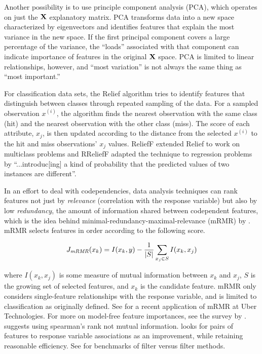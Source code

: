 \documentclass[11pt]{article}
\renewcommand{\xi}{x^{(i)}}
\begin{document}
Another possibility is to use principle component analysis (PCA), which operates on just the $\bf X$ explanatory matrix. PCA transforms data into a new space characterized by eigenvectors and identifies features that explain the most variance in the new space. If the first principal component covers a large percentage of the variance, the ``loads'' associated with that component can indicate importance of features in the original $\bf X$ space. PCA is limited to linear relationships, however, and ``most variation'' is not always the same thing as ``most important.''

For classification data sets, the Relief algorithm \citep{relief} tries to identify features that distinguish between classes through repeated sampling of the data. For a sampled observation $\xi$, the algorithm finds the nearest observation with the same class (hit) and the nearest observation with the other class (miss). The score of each attribute, $x_j$, is then updated according to the distance from the selected $\xi$ to the hit and miss observations'  $x_j$ values. ReliefF \citep{ReliefF} extended Relief to work on multiclass problems and RReliefF \citep{RReliefF} adapted the technique to regression problems by ``...introduc[ing] a kind of probability that the predicted values of two instances are different''.

In an effort to deal with codependencies, data analysis techniques can rank features not just by {\em relevance} (correlation with the response variable) but also by low {\em redundancy}, the amount of information shared between codependent features, which is the idea behind minimal-redundancy-maximal-relevance (mRMR) by \citet{mRMR}. mRMR selects features in order according to the following score.

\[
J_{\text{\it mRMR}}(x_k) = I(x_k, y) - \frac{1}{|S|} \sum_{x_j \in S} I(x_k, x_j)
\]

\noindent where $I(x_k, x_j)$ is some measure of mutual information between $x_k$ and $x_j$, $S$ is the growing set of selected features, and $x_k$ is the candidate feature. mRMR only considers single-feature relationships with the response variable, and is limited to classification as originally defined. See \cite{ubermRMR} for a recent application of mRMR at Uber Technologies.  For more on model-free feature importances, see the survey by \cite{survey}.  \citet{tsanas} suggests using spearman's rank not mutual information. \citet{meyer-microarray} looks for pairs of features to response variable associations as an improvement, while retaining reasonable efficiency. See \citet{filter-benchmark} for benchmarks of filter versus filter methods.
\end{document}
